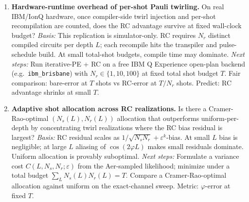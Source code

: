 \begin{enumerate}
  \item \textbf{Hardware-runtime overhead of per-shot Pauli twirling.}
  On real IBM/IonQ hardware, once compiler-side twirl injection and per-shot recompilation are counted, does the RC advantage survive at fixed wall-clock budget?
  \emph{Basis:} This replication is simulator-only. RC requires $N_r$ distinct compiled circuits per depth $L$; each recompile hits the transpiler and pulse-schedule build. At small total-shot budgets, compile time may dominate.
  \emph{Next steps:} Run iterative-PE + RC on a free IBM Q Experience open-plan backend (e.g.\ \texttt{ibm\_brisbane}) with $N_r\in\{1,10,100\}$ at fixed total shot budget $T$. Fair comparison: bare-error at $T$ shots vs RC-error at $T/N_r$ shots. Predict: RC advantage shrinks at small $T$.

  \item \textbf{Adaptive shot allocation across RC realizations.}
  Is there a Cramer-Rao-optimal $(N_s(L), N_r(L))$ allocation that outperforms uniform-per-depth by concentrating twirl realizations where the RC bias residual is largest?
  \emph{Basis:} RC residual scales as $1/\sqrt{N_s N_r} + \varepsilon^k$-bias. At small $L$ bias is negligible; at large $L$ aliasing of $\cos(2\varphi L)$ makes small residuals dominate. Uniform allocation is provably suboptimal.
  \emph{Next steps:} Formulate a variance cost $C(L, N_s, N_r; \varepsilon)$ from the Aer-sampled likelihood; minimize under a total budget $\sum_L N_s(L) N_r(L) = T$. Compare a Cramer-Rao-optimal allocation against uniform on the exact-channel sweep. Metric: $\varphi$-error at fixed $T$.
\end{enumerate}
